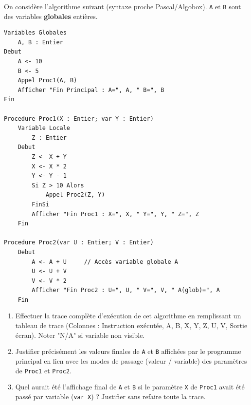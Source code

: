 \documentclass[11pt]{article}
\begin{document}
\begin{exercice}
On considère l'algorithme suivant (syntaxe proche Pascal/Algobox). \texttt{A} et \texttt{B} sont des variables \textbf{globales} entières.
\begin{verbatim}
Variables Globales
    A, B : Entier
Debut
    A <- 10
    B <- 5
    Appel Proc1(A, B)
    Afficher "Fin Principal : A=", A, " B=", B
Fin

Procedure Proc1(X : Entier; var Y : Entier)
    Variable Locale
        Z : Entier
    Debut
        Z <- X + Y
        X <- X * 2
        Y <- Y - 1
        Si Z > 10 Alors
            Appel Proc2(Z, Y)
        FinSi
        Afficher "Fin Proc1 : X=", X, " Y=", Y, " Z=", Z
    Fin

Procedure Proc2(var U : Entier; V : Entier)
    Debut
        A <- A + U     // Accès variable globale A
        U <- U + V
        V <- V * 2
        Afficher "Fin Proc2 : U=", U, " V=", V, " A(glob)=", A
    Fin
\end{verbatim}
\begin{enumerate}
    \item Effectuer la trace complète d'exécution de cet algorithme en remplissant un tableau de trace (Colonnes : Instruction exécutée, A, B, X, Y, Z, U, V, Sortie écran). Noter "N/A" si variable non visible.
    \item Justifier précisément les valeurs finales de \texttt{A} et \texttt{B} affichées par le programme principal en lien avec les modes de passage (valeur / variable) des paramètres de \texttt{Proc1} et \texttt{Proc2}.
    \item Quel aurait été l'affichage final de \texttt{A} et \texttt{B} si le paramètre \texttt{X} de \texttt{Proc1} avait été passé par variable (\texttt{var X}) ? Justifier sans refaire toute la trace.
\end{enumerate}
\end{exercice}
\end{document}

